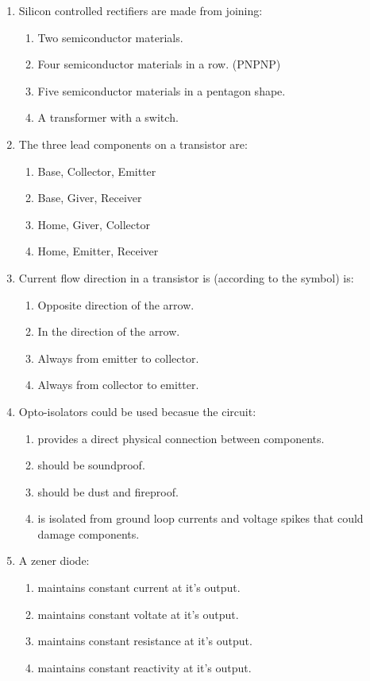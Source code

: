 \documentclass[10pt]{article}
\begin{document}
\begin{multicols}{2}
\begin{enumerate}
\item Silicon controlled rectifiers are made from joining:
	\begin{enumerate}
	\item Two semiconductor materials.
	\item Four semiconductor materials in a row. (PNPNP)
	\item Five semiconductor materials in a pentagon shape.
	\item A transformer with a switch.
	\end{enumerate}
\item The three lead components on a transistor are:
	\begin{enumerate}
	\item Base, Collector, Emitter
	\item Base, Giver, Receiver
	\item Home, Giver, Collector
	\item Home, Emitter, Receiver
	\end{enumerate}
\item Current flow direction in a transistor is (according to the symbol) is:
	\begin{enumerate}
	\item Opposite direction of the arrow.
	\item In the direction of the arrow.
	\item Always from emitter to collector.
	\item Always from collector to emitter.
	\end{enumerate}
\item Opto-isolators could be used becasue the circuit:
	\begin{enumerate}
	\item provides a direct physical connection between components.
	\item should be soundproof.
	\item should be dust and fireproof.
	\item is isolated from ground loop currents and voltage spikes that could damage components.
	\end{enumerate}
\item A zener diode:
	\begin{enumerate}
	\item maintains constant current at it's output.
	\item maintains constant voltate at it's output.
	\item maintains constant resistance at it's output.
	\item maintains constant reactivity at it's output.
	\end{enumerate}
\end{enumerate}
\end{multicols}
\end{document}
